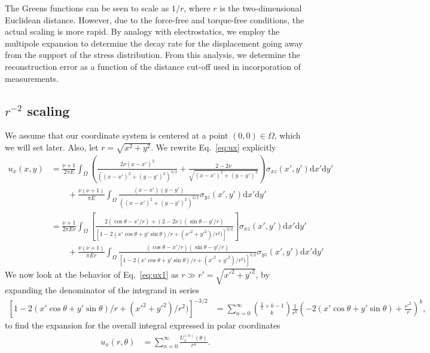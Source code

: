 \documentclass{article}
\newcommand{\dd}{\mathrm{d}}
\begin{document}
The Greens functions can be seen to scale as $1/r$, where $r$ is the two-dimensional Euclidean distance. However, due to the force-free and torque-free conditions, the actual scaling is more rapid. By analogy with electrostatics, we employ the multipole expansion to determine the decay rate for the displacement going away from the support of the stress distribution. From this analysis, we determine the reconstruction error as a function of the distance cut-off used in incorporation of measurements.


\subsection{$r^{-2}$ scaling}

We assume that our coordinate system is centered at a point $(0,0)\in\Omega$, which we will set later.  Also, let $r=\sqrt{x^2+y^2}$.
We rewrite Eq.~\ref{eq:ux} explicitly
\begin{align}
u_x(x,y) &=\frac{\nu+1}{2\pi E} \int_\Omega \left(\frac{2\nu (x-x')^2}{( (x-x')^2+(y-y')^2)^{3/2}} + \frac{2-2\nu}{\sqrt{(x-x')^2+(y-y')^2}}   \right)
 \sigma_{xz}(x',y') \dd x'\dd y' \nonumber\\
 &\qquad+  \frac{\nu(\nu+1)}{\pi E} \int_\Omega   \frac{(x-x')(y-y')}{ ( (x-x')^2+(y-y')^2)^{3/2}} \sigma_{yz}(x',y')  \dd x'\dd y'  \nonumber\\
 &= \frac{\nu+1}{2\pi E r}   \int_\Omega \left[  \frac{  2(\cos\theta-x'/r) + (2-2\nu)(\sin\theta-y'/r) }{ [1-2(x'\cos\theta +y'\sin\theta)/r + (x'^2+y'^2)/r^2)]^{3/2} }\right] \sigma_{xz}(x',y')  \dd x' \dd y' \nonumber\\
 &\qquad +  \frac{\nu(\nu+1)}{\pi E r} \int_\Omega \frac{(\cos\theta - x'/r)(\sin\theta - y'/r)}{[ 1-2(x'\cos\theta +y'\sin\theta)/r + (x'^2+y'^2)/r^2)]^{3/2} }\sigma_{yz}(x',y')\dd x' \dd y'
\label{eq:ux1}
\end{align}
We now look at the behavior of Eq.~\ref{eq:ux1} as $r\gg r' = \sqrt{x'^2+y'^2}$, by expanding the denominator of the integrand in series
\begin{align}
\left[1-2(x'\cos\theta +y'\sin\theta)/r + (x'^2+y'^2)/r^2)\right]^{-3/2} &= \sum_{n=0}^\infty {{\frac{3}{2}+k-1}\choose{k}}\frac{1}{r^k}\left( -2(x'\cos\theta + y'\sin\theta) + \frac{r'^2}{r}  \right)^k,
\end{align}
to find the expansion for the overall integral expressed in polar coordinates
\begin{align}
u_x(r,\theta) &= \sum_{n=0}^\infty \frac{U_x^{(n)}(\theta)}{r^n}.
\end{align}
\end{document}
